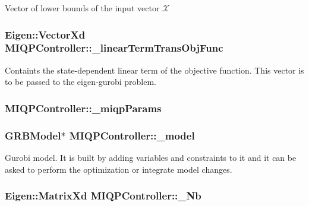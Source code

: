 \-Vector of lower bounds of the input vector $\mathcal{X}$ \hypertarget{classMIQPController_ac2ec0c5287589fe28f7381ebeaa5f4ef}{
\subsubsection[{\-\_\-linear\-Term\-Trans\-Obj\-Func}]{\setlength{\rightskip}{0pt plus 5cm}\-Eigen\-::\-Vector\-Xd {\bf \-M\-I\-Q\-P\-Controller\-::\-\_\-linear\-Term\-Trans\-Obj\-Func}}}\label{classMIQPController_ac2ec0c5287589fe28f7381ebeaa5f4ef}
\-Containts the state-\/dependent linear term of the objective function. \-This vector is to be passed to the eigen-\/gurobi problem. \hypertarget{classMIQPController_a23f6caec48541df0ebe3f91189171ce5}{
\subsubsection[{\-\_\-miqp\-Params}]{ {\bf \-M\-I\-Q\-P\-Controller\-::\-\_\-miqp\-Params}}}\label{classMIQPController_a23f6caec48541df0ebe3f91189171ce5}
\hypertarget{classMIQPController_a2bafe24633a7f8c9d6211cde12b29a90}{
\subsubsection[{\-\_\-model}]{\setlength{\rightskip}{0pt plus 5cm}\-G\-R\-B\-Model$\ast$ {\bf \-M\-I\-Q\-P\-Controller\-::\-\_\-model}}}\label{classMIQPController_a2bafe24633a7f8c9d6211cde12b29a90}
\-Gurobi model. \-It is built by adding variables and constraints to it and it can be asked to perform the optimization or integrate model changes. \hypertarget{classMIQPController_aaed002a2578a0f83c4ee59516a793f98}{
\subsubsection[{\-\_\-\-Nb}]{\setlength{\rightskip}{0pt plus 5cm}\-Eigen\-::\-Matrix\-Xd {\bf \-M\-I\-Q\-P\-Controller\-::\-\_\-\-Nb}}}\label{classMIQPController_aaed002a2578a0f83c4ee59516a793f98}
